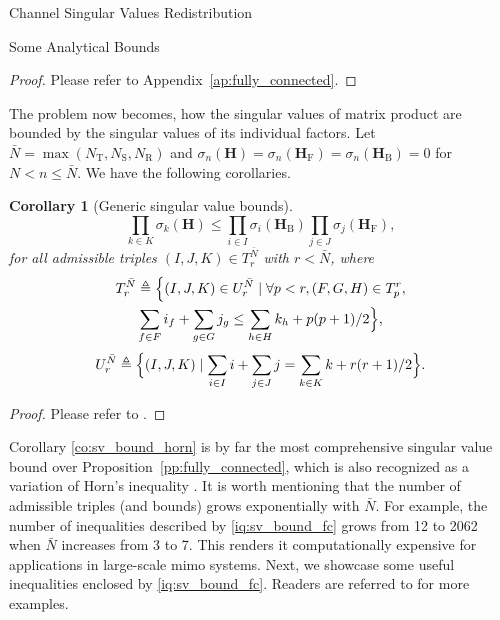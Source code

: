 \documentclass[journal]{IEEEtran}
\newtheorem{corollary}{Corollary}[proposition]
\begin{document}
\begin{section}{Channel Singular Values Redistribution}
\begin{subsection}{Some Analytical Bounds}
		\begin{proof}
			Please refer to Appendix~\ref{ap:fully_connected}.
		\end{proof}

		The problem now becomes, how the singular values of matrix product are bounded by the singular values of its individual factors.
		Let $\bar{N} = \max(N_\mathrm{T},N_\mathrm{S},N_\mathrm{R})$ and $\sigma_n(\mathbf{H})=\sigma_n(\mathbf{H}_\mathrm{F})=\sigma_n(\mathbf{H}_\mathrm{B})=0$ for $N < n \le \bar{N}$.
		We have the following corollaries.

		\begin{corollary}[Generic singular value bounds\label{co:sv_bound_horn}]
			\begin{equation}
				\prod_{k \in {K}} \sigma_k(\mathbf{H}) \le \prod_{i \in {I}} \sigma_i(\mathbf{H}_\mathrm{B}) \prod_{j \in {J}} \sigma_j(\mathbf{H}_\mathrm{F}),
				\label{iq:sv_bound_fc}
			\end{equation}
			for all admissible triples $(I, J, K) \in T_r^{\bar{N}}$ with $r < \bar{N}$, where
			\begin{equation*}
				\begin{gathered}
					T_r^{\bar{N}} \triangleq \Bigl\{(I, J, K) \in U_r^{\bar{N}} \mid \forall p < r, (F, G, H) \in T_p^r,\\
					\sum_{f \in F} i_f + \sum_{g \in G} j_g \le \sum_{h \in H} k_h + p(p+1)/2 \Bigr\},
				\end{gathered}
			\end{equation*}
			\begin{equation*}
				U_r^{\bar{N}} \triangleq \Bigl\{(I, J, K) \mid \sum_{i \in I} i + \sum_{j \in J} j = \sum_{k \in K} k + r(r+1)/2\Bigr\}.
			\end{equation*}
		\end{corollary}

		\begin{proof}
			Please refer to \cite[Theorem~8]{Fulton2000}.
		\end{proof}

		Corollary \eqref{co:sv_bound_horn} is by far the most comprehensive singular value bound over Proposition~\ref{pp:fully_connected}, which is also recognized as a variation of Horn's inequality \cite{Bhatia2001}.
		It is worth mentioning that the number of admissible triples (and bounds) grows exponentially with $\bar{N}$.
		For example, the number of inequalities described by \eqref{iq:sv_bound_fc} grows from 12 to 2062 when $\bar{N}$ increases from 3 to 7.
		This renders it computationally expensive for applications in large-scale \gls{mimo} systems.
		Next, we showcase some useful inequalities enclosed by \eqref{iq:sv_bound_fc}.
		Readers are referred to \cite[Chapter 16, 24]{Hogben2013} for more examples.


\end{subsection}
\end{section}
\end{document}
